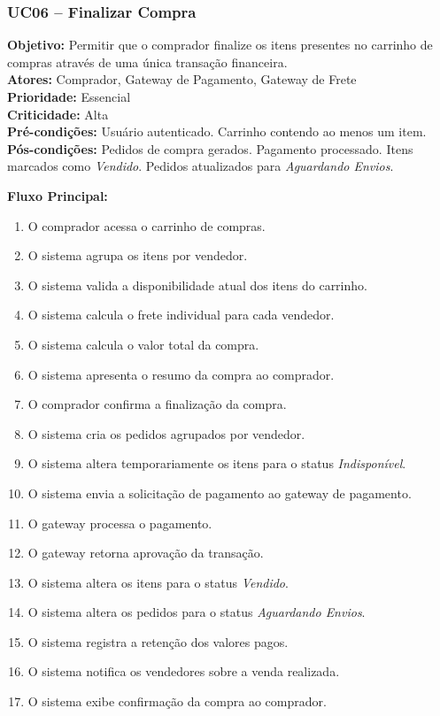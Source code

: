 \documentclass[
	article,			%
	11pt,				%
	oneside,			%
	a4paper,			%
	english,			%
	brazil,				%
	sumario=tradicional
	]{abntex2}
\begin{document}
\subsubsection{UC06 – Finalizar Compra}
\label{uc:04}
\noindent\textbf{Objetivo:} Permitir que o comprador finalize os itens presentes no carrinho de compras através de uma única transação financeira.\\
\textbf{Atores:} Comprador, Gateway de Pagamento, Gateway de Frete\\
\textbf{Prioridade:} Essencial\\
\textbf{Criticidade:} Alta\\
\textbf{Pré-condições:} Usuário autenticado. Carrinho contendo ao menos um item.\\
\textbf{Pós-condições:} Pedidos de compra gerados. Pagamento processado. Itens marcados como \textit{Vendido}. Pedidos atualizados para \textit{Aguardando Envios}.

\vspace{0.5em}
\noindent\textbf{Fluxo Principal:}
\begin{enumerate}[label=\arabic*.]
    \item O comprador acessa o carrinho de compras.
    \item O sistema agrupa os itens por vendedor.
    \item O sistema valida a disponibilidade atual dos itens do carrinho.
    \item O sistema calcula o frete individual para cada vendedor.
    \item O sistema calcula o valor total da compra.
    \item O sistema apresenta o resumo da compra ao comprador.
    \item O comprador confirma a finalização da compra.
    \item O sistema cria os pedidos agrupados por vendedor.
    \item O sistema altera temporariamente os itens para o status \textit{Indisponível}.
    \item O sistema envia a solicitação de pagamento ao gateway de pagamento.
    \item O gateway processa o pagamento.
    \item O gateway retorna aprovação da transação.
    \item O sistema altera os itens para o status \textit{Vendido}.
    \item O sistema altera os pedidos para o status \textit{Aguardando Envios}.
    \item O sistema registra a retenção dos valores pagos.
    \item O sistema notifica os vendedores sobre a venda realizada.
    \item O sistema exibe confirmação da compra ao comprador.
\end{enumerate}
\end{document}
